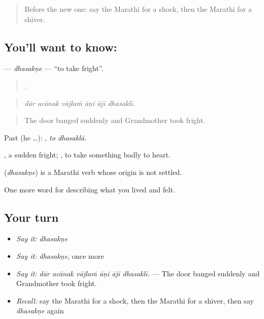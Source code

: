\label{lesson:MR-C452-dhasakne}



\begin{quote}
Before the new one: say the Marathi for a shock, then the Marathi for a shiver.
\end{quote}

\subsection*{You'll want to know: }
\textbf{} — \emph{dhasakṇe} — \textquotedblleft{}to take fright\textquotedblright{}.

\begin{quote}
     .
\end{quote}

\begin{quote}
\emph{dār acānak vājlaṁ āṇi ājī dhasaklī.}
\end{quote}

\begin{quote}
The door banged suddenly and Grandmother took fright.
\end{quote}

Past (he …):  , \emph{to dhasaklā}.

, a sudden fright;  , to take something badly to heart.

\begin{cousinweb}
\textbf{} (\emph{dhasakṇe}) is a Marathi verb whose origin is not settled.
\end{cousinweb}

\begin{grammarlens}[title={What you've built}]
One more word for describing what you lived and felt.
\end{grammarlens}

\subsection*{Your turn}
\begin{itemize}
\raggedright
  \item \emph{Say it:} \emph{dhasakṇe}
  \item \emph{Say it:} \emph{dhasakṇe}, once more
  \item \emph{Say it:} \emph{dār acānak vājlaṁ āṇi ājī dhasaklī.} — The door banged suddenly and Grandmother took fright.
  \item \emph{Recall:} say the Marathi for a shock, then the Marathi for a shiver, then say \emph{dhasakṇe} again
\end{itemize}


